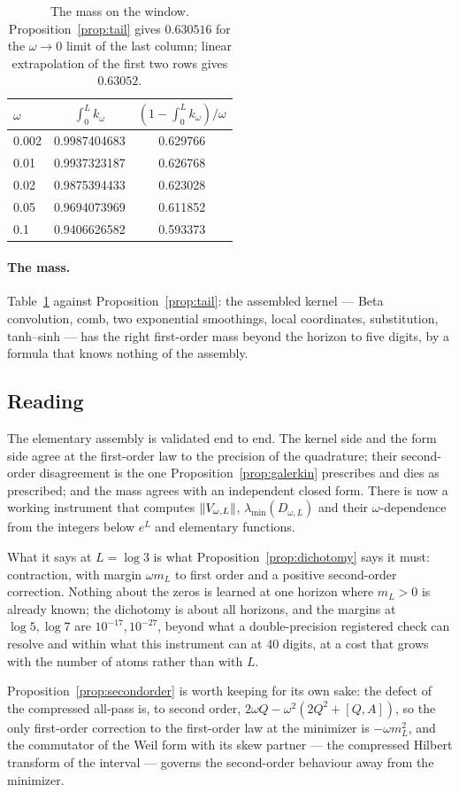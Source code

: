 \begin{table}[ht]\centering\small
\caption{The mass on the window. Proposition~\ref{prop:tail} gives $0.630516$
for the $\omega\to0$ limit of the last column; linear extrapolation of the
first two rows gives $0.63052$.}\label{tab:mass}
\begin{tabular}{@{}lcc@{}}
\toprule
$\omega$ & $\int_0^Lk_\omega$ & $(1-\int_0^Lk_\omega)/\omega$\\
\midrule
0.002 & 0.9987404683 & 0.629766\\
0.01 & 0.9937323187 & 0.626768\\
0.02 & 0.9875394433 & 0.623028\\
0.05 & 0.9694073969 & 0.611852\\
0.1 & 0.9406626582 & 0.593373\\
\bottomrule
\end{tabular}
\end{table}

\paragraph{The mass.} Table~\ref{tab:mass} against Proposition~\ref{prop:tail}:
the assembled kernel --- Beta convolution, comb, two exponential smoothings,
local coordinates, substitution, tanh--sinh --- has the right first-order
mass beyond the horizon to five digits, by a formula that knows nothing of the
assembly.

\subsection{Reading}

The elementary assembly is validated end to end. The kernel side and the form
side agree at the first-order law to the precision of the quadrature; their
second-order disagreement is the one Proposition~\ref{prop:galerkin}
prescribes and dies as prescribed; and the mass agrees with an independent
closed form. There is now a working instrument that computes
$\lVert V_{\omega,L}\rVert$, $\lambda_{\min}(D_{\omega,L})$ and their
$\omega$-dependence from the integers below $e^L$ and elementary functions.

What it says at $L=\log3$ is what Proposition~\ref{prop:dichotomy} says it
must: contraction, with margin $\omega m_L$ to first order and a positive
second-order correction. Nothing about the zeros is learned at one horizon
where $m_L>0$ is already known; the dichotomy is about all horizons, and the
margins at $\log5,\log7$ are $10^{-17},10^{-27}$, beyond what a
double-precision registered check can resolve and within what this instrument
can at 40 digits, at a cost that grows with the number of atoms rather than
with $L$.

Proposition~\ref{prop:secondorder} is worth keeping for its own sake: the
defect of the compressed all-pass is, to second order, $2\omega Q-\omega^2(2Q^2+[Q,A])$,
so the only first-order correction to the first-order law at the minimizer is
$-\omega m_L^2$, and the commutator of the Weil form with its skew partner ---
the compressed Hilbert transform of the interval --- governs the second-order
behaviour away from the minimizer.
